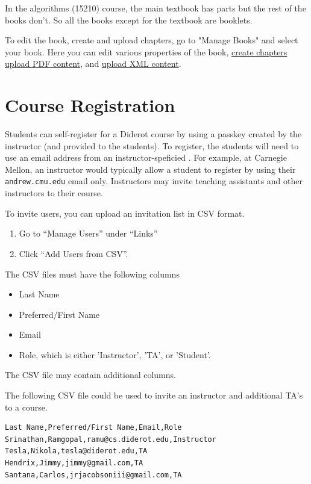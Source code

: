 \begin{example}
In the algorithms (15210) course, the main textbook has parts but
the rest of the books don't.  So all the books except for the textbook are booklets.
\end{example}


\begin{gram}
To edit the book, create and upload chapters, go to "Manage Books" and select your book.  Here you can edit various properties of the book, 
%
\href{guide:chapter::create}{create chapters}
%
\href{guide:chapter::upload-pdf}{upload PDF content}, and
\href{guide:chapter::upload-xml}{upload XML content}.
\end{gram}


\section{Course Registration} 

Students can self-register for a Diderot course by using a  passkey created by the instructor (and provided to the students).  
%
To register, the students will need to use an email address from an instructor-speficied  .
%
For example, at Carnegie Mellon, an instructor would typically allow a student to register by using their  \lstinline`andrew.cmu.edu` email only.
%
Instructors may invite teaching assistants and other instructors to their course.

To invite users, you can upload an invitation list in CSV format. 
%
\begin{enumerate}
\item
Go to ``Manage Users'' under ``Links'' 
\item
Click ``Add Users from CSV''.
\end{enumerate}
%
The CSV files must have the following columns
\begin{itemize}
\item Last Name
\item Preferred/First Name
\item Email
\item Role, which is either 'Instructor', 'TA', or 'Student'. 
\end{itemize} 
%
The CSV file may contain additional columns.

\begin{example}
The following CSV file could be used to invite an instructor and additional TA's to a course.

\begin{lstlisting}
Last Name,Preferred/First Name,Email,Role
Srinathan,Ramgopal,ramu@cs.diderot.edu,Instructor
Tesla,Nikola,tesla@diderot.edu,TA
Hendrix,Jimmy,jimmy@gmail.com,TA
Santana,Carlos,jrjacobsoniii@gmail.com,TA
\end{lstlisting}

\end{example}
